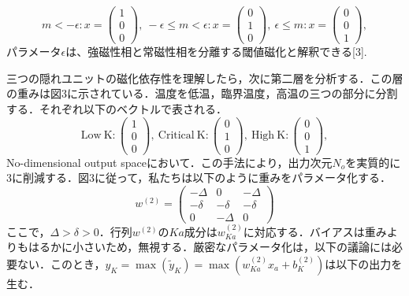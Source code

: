 \documentclass[a4paper,11pt]{jsreport}
\begin{document}
\begin{equation}
  m<-\epsilon : x=
  \begin{pmatrix}
    1 \\ 0 \\ 0
  \end{pmatrix}, \
  -\epsilon \leq m < \epsilon : x=
  \begin{pmatrix}
    0 \\ 1 \\ 0
  \end{pmatrix}, \
  \epsilon \leq m : x=
  \begin{pmatrix}
    0 \\ 0 \\ 1
  \end{pmatrix},
\end{equation}
パラメータ$\epsilon$は、強磁性相と常磁性相を分離する閾値磁化と解釈できる[3].\par
三つの隠れユニットの磁化依存性を理解したら，次に第二層を分析する．この層の重みは図3に示されている．温度を低温，臨界温度，高温の三つの部分に分割する．それぞれ以下のベクトルで表される．
\begin{equation}
  \text{Low} \ \text{K} :
  \begin{pmatrix}
    1 \\ 0 \\ 0
  \end{pmatrix}, \
  \text{Critical} \ \text{K} :
  \begin{pmatrix}
    0 \\ 1 \\ 0
  \end{pmatrix}, \
  \text{High} \ \text{K} :
  \begin{pmatrix}
    0 \\ 0 \\ 1
  \end{pmatrix},
\end{equation}
No-dimensional output spaceにおいて．この手法により，出力次元$N_o$を実質的に3に削減する．図3に従って，私たちは以下のように重みをパラメータ化する．
\begin{equation}
  w^{(2)} =
  \begin{pmatrix}
    -\Delta & 0       & -\Delta \\
    -\delta & -\delta & -\delta \\
    0       & -\Delta & 0
  \end{pmatrix}
\end{equation}
ここで，$\Delta > \delta > 0$．行列$w^{(2)}$の$Ka$成分は$w_{Ka}^{(2)}$に対応する．バイアスは重みよりもはるかに小さいため，無視する．厳密なパラメータ化は，以下の議論には必要ない．このとき，$y_K = \max{(\tilde{y}_K)}=\max{(w_{Ka}^{(2)}x_a+b_K^{(2)})}$は以下の出力を生む．
\end{document}

